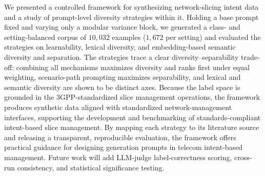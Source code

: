 \documentclass[conference]{IEEEtran}
\begin{document}
We presented a controlled framework for synthesizing network-slicing intent data and a study of prompt-level diversity strategies within it. Holding a base prompt fixed and varying only a modular variance block, we generated a class- and setting-balanced corpus of $10{,}032$ examples ($1{,}672$ per setting) and evaluated the strategies on learnability, lexical diversity, and embedding-based semantic diversity and separation. The strategies trace a clear diversity--separability trade-off: combining all mechanisms maximizes diversity and ranks first under equal weighting, scenario-path prompting maximizes separability, and lexical and semantic diversity are shown to be distinct axes. Because the label space is grounded in the 3GPP-standardized slice management operations, the framework produces synthetic data aligned with standardized network-management interfaces, supporting the development and benchmarking of standards-compliant intent-based slice management. By mapping each strategy to its literature source and releasing a transparent, reproducible evaluation, the framework offers practical guidance for designing generation prompts in telecom intent-based management. Future work will add LLM-judge label-correctness scoring, cross-run consistency, and statistical significance testing.



\end{document}
